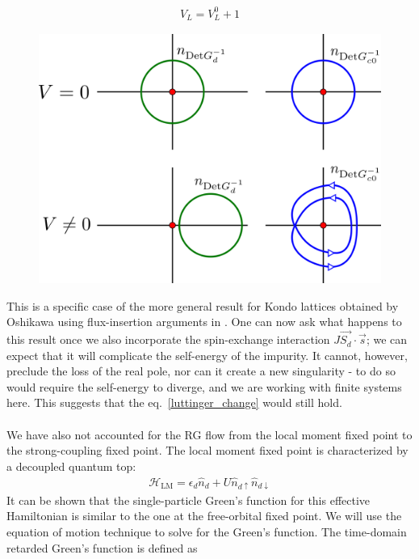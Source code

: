 \documentclass[twoside,11pt]{report}
\numberwithin{equation}{section}
\begin{document}
\begin{equation}\begin{aligned}
	\label{luttinger_change}
	V_L = V_L^0 + 1
\end{aligned}\end{equation}
\begin{figure}[htpb]
	\centering
	\includegraphics[scale=0.2]{../figures/luttinger_top_change.png}
\end{figure}
This is a specific case of the more general result for Kondo lattices obtained by Oshikawa using flux-insertion arguments in \cite{oshikawa}.
One can now ask what happens to this result once we also incorporate the spin-exchange interaction \(J \vec{S_d}\cdot\vec{s}\); we can expect that it will complicate the self-energy of the impurity. It cannot, however, preclude the loss of the real pole, nor can it create a new singularity - to do so would require the self-energy to diverge, and we are working with finite systems here. This suggests that the eq.~\ref{luttinger_change} would still hold.
\\\\We have also not accounted for the RG flow from the local moment fixed point to the strong-coupling fixed point. The local moment fixed point is characterized by a decoupled quantum top:
\begin{equation}\begin{aligned}
	\mathcal{H}_\text{LM} = \epsilon_d \hat n_d + U \hat n_{d \uparrow} \hat n_{d \downarrow}
\end{aligned}\end{equation}
It can be shown that the single-particle Green's function for this effective Hamiltonian is similar to the one at the free-orbital fixed point. We will use the equation of motion technique to solve for the Green's function. The time-domain retarded Green's function is defined as
\end{document}
